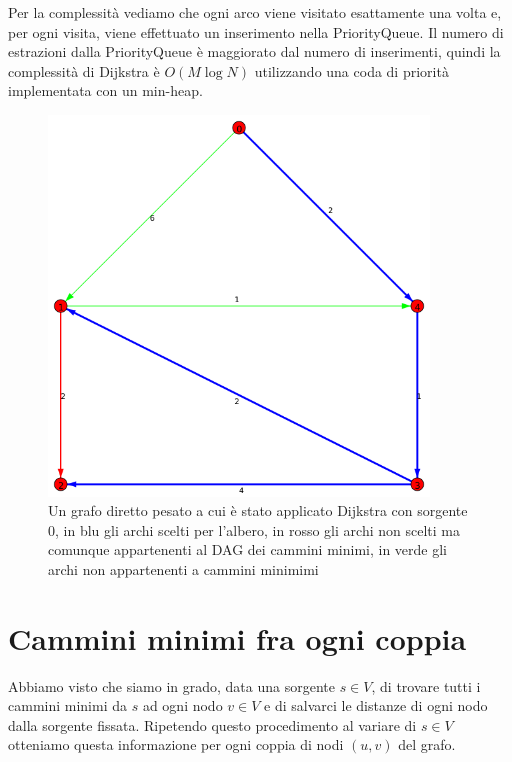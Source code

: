 \documentclass[a4paper,10pt]{amsbook}
\theoremstyle{plain}
\theoremstyle{definition}
\theoremstyle{remark}
\begin{document}
Per la complessit\`a vediamo che ogni arco viene visitato esattamente
una volta e, per ogni visita, viene effettuato un inserimento nella
PriorityQueue. Il numero di estrazioni dalla PriorityQueue \`e
maggiorato dal numero di inserimenti, quindi la complessit\`a di
Dijkstra \`e $O(M\log N)$ utilizzando una coda di priorit\`a
implementata con un min-heap.

\begin{figure}[h]
  \centering
  \includegraphics[width=0.9\textwidth]{dijkstra}
  \caption{Un grafo diretto pesato a cui è stato applicato Dijkstra
    con sorgente $0$, in blu gli archi scelti per l'albero, in rosso gli
    archi non scelti ma comunque appartenenti al DAG dei cammini
    minimi, in verde gli archi non appartenenti a cammini minimimi}
  \label{fig:dijkstra}
\end{figure}


\section{Cammini minimi fra ogni coppia}

Abbiamo visto che siamo in grado, data una sorgente $s\in V$, di
trovare tutti i cammini minimi da $s$ ad ogni nodo $v\in V$ e di
salvarci le distanze di ogni nodo dalla sorgente fissata. Ripetendo
questo procedimento al variare di $s\in V$ otteniamo questa
informazione per ogni coppia di nodi $(u,v)$ del grafo.
\end{document}
